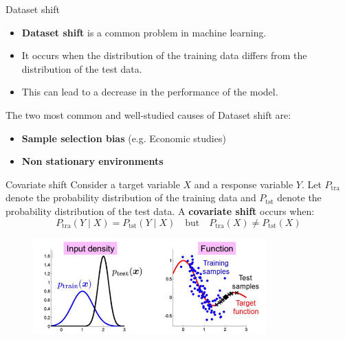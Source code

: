 \begin{frame}{Dataset shift}
	\begin{itemize}
		\item \textbf{Dataset shift} is a common problem in machine learning.
		
		\item It occurs when the distribution of the training data differs from the distribution of the test data.
		
		\item This can lead to a decrease in the performance of the model.
	\end{itemize}
	The two most common and well-studied causes of Dataset shift are:
	\begin{itemize}
		\item \textbf{Sample selection bias} (e.g. Economic studies) %
		
		\item \textbf{Non stationary environments}%
	\end{itemize}
\end{frame} 


\begin{frame}{Covariate shift}
	Consider a target variable \( X \) and a response variable \( Y \). Let \( P_{\text{tra}} \) denote the probability distribution of the training data and \( P_{\text{tst}} \) denote the probability distribution of the test data. A \textbf{covariate shift} occurs when:  
	\vspace{0.3cm}
	\[	P_{\text{tra}}(Y \mid X) = P_{\text{tst}}(Y \mid X) \quad \text{but} \quad P_{\text{tra}}(X) \neq P_{\text{tst}}(X)	\]
	
	\begin{figure}[H]
		\centering
		\includegraphics[width=9cm]{../assets/immagine.png}
		\label{fig:immagine}
	\end{figure}
\end{frame}

